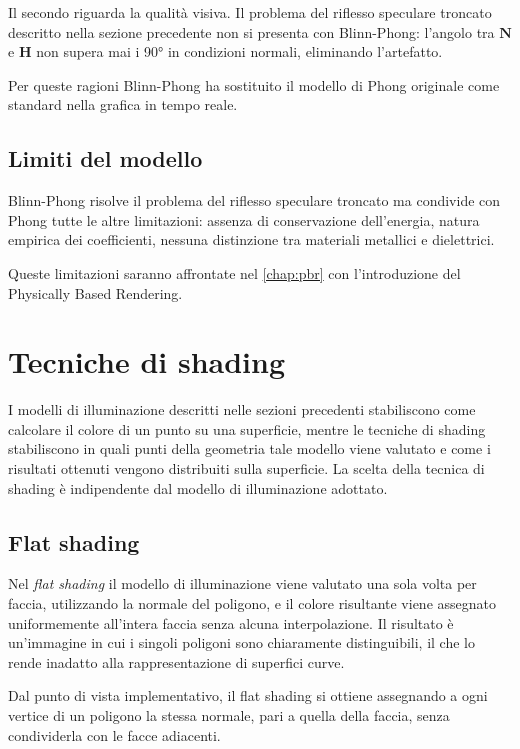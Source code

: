 \documentclass[12pt,a4paper,twoside]{book}
\begin{document}
Il secondo riguarda la qualità visiva. Il problema del riflesso speculare troncato descritto nella sezione precedente non si presenta con Blinn-Phong: l'angolo tra $\mathbf{N}$ e $\mathbf{H}$ non supera mai i 90° in condizioni normali, eliminando l'artefatto.

Per queste ragioni Blinn-Phong ha sostituito il modello di Phong originale come standard nella grafica in tempo reale.

\subsection{Limiti del modello}

Blinn-Phong risolve il problema del riflesso speculare troncato ma condivide con Phong tutte le altre limitazioni: assenza di conservazione dell'energia, natura empirica dei coefficienti, nessuna distinzione tra materiali metallici e dielettrici.

Queste limitazioni saranno affrontate nel \cref{chap:pbr} con l'introduzione del Physically Based Rendering.

\section{Tecniche di shading}
\label{sec:shading}

I modelli di illuminazione descritti nelle sezioni precedenti stabiliscono come calcolare il colore di un punto su una superficie, mentre le tecniche di shading stabiliscono in quali punti della geometria tale modello viene valutato e come i risultati ottenuti vengono distribuiti sulla superficie. La scelta della tecnica di shading è indipendente dal modello di illuminazione adottato.

\subsection{Flat shading}
\label{subsec:flat}

Nel \textit{flat shading} il modello di illuminazione viene valutato una sola volta per faccia, utilizzando la normale del poligono, e il colore risultante viene assegnato uniformemente all'intera faccia senza alcuna interpolazione. Il risultato è un'immagine in cui i singoli poligoni sono chiaramente distinguibili, il che lo rende inadatto alla rappresentazione di superfici curve.

Dal punto di vista implementativo, il flat shading si ottiene assegnando a ogni vertice di un poligono la stessa normale, pari a quella della faccia, senza condividerla con le facce adiacenti.
\end{document}
